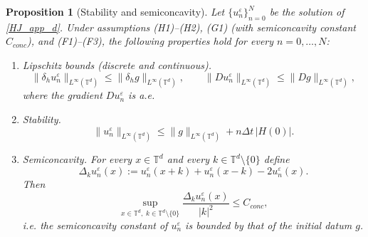 \documentclass[10pt,a4paper]{amsart}
\newtheorem{prop}{Proposition}
\newcommand{\T}{{\mathbb{T}}}
\begin{document}
\begin{prop}[Stability and semiconcavity]\label{prop:properties_scheme}
Let \(\{u^\varepsilon_n\}_{n=0}^N\) be the solution of \eqref{HJ_app_d}. 
Under assumptions \textup{(H1)--(H2)}, \textup{(G1)} (with semiconcavity constant \(C_{conc}\)), and \textup{(F1)--(F3)}, the following properties hold for every \(n=0,\dots,N\):
\begin{enumerate}
  \item[\textup{(i)}] Lipschitz bounds (discrete and continuous).
  \[
    \|\delta_h u^\varepsilon_n\|_{L^\infty(\T^d)} \le \|\delta_h g\|_{L^\infty(\T^d)},
    \qquad
    \|Du^\varepsilon_n\|_{L^\infty(\T^d)} \le \|Dg\|_{L^\infty(\T^d)},
  \]
  where the gradient \(Du^\varepsilon_n\) is a.e.
  \item[\textup{(ii)}] Stability.
  \[
    \|u^\varepsilon_n\|_{L^\infty(\T^d)} \le \|g\|_{L^\infty(\T^d)} + n\Delta t\,|H(0)|.
  \]
  \item[\textup{(iii)}] Semiconcavity. For every \(x\in\T^d\) and every \(k\in\T^d\setminus\{0\}\) define
  \[
    \Delta_k u^\varepsilon_n(x):=u^\varepsilon_n(x+k)+u^\varepsilon_n(x-k)-2u^\varepsilon_n(x).
  \]
  Then
  \begin{equation}\label{semiconc_solutions_finite_diff}
    \sup_{x\in\T^d,\; k\in \T^d\setminus\{0\}}\frac{\Delta_k u^\varepsilon_n(x)}{|k|^2} \le C_{conc},
  \end{equation}
  i.e. the semiconcavity constant of \(u^\varepsilon_n\) is bounded by that of the initial datum \(g\).
\end{enumerate}
\end{prop}
\end{document}
